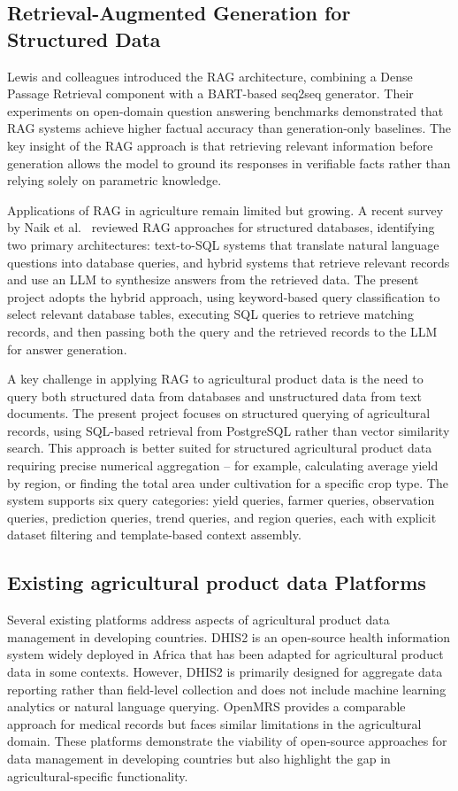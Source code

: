 \documentclass[12pt,a4paper,oneside]{report}
\begin{document}
\subsection{Retrieval-Augmented Generation for Structured Data}
Lewis and colleagues \cite{lewis2020} introduced the RAG architecture, combining a Dense Passage Retrieval component with a BART-based seq2seq generator. Their experiments on open-domain question answering benchmarks demonstrated that RAG systems achieve higher factual accuracy than generation-only baselines. The key insight of the RAG approach is that retrieving relevant information before generation allows the model to ground its responses in verifiable facts rather than relying solely on parametric knowledge.

Applications of RAG in agriculture remain limited but growing. A recent survey by Naik et al.\ \cite{naik2024} reviewed RAG approaches for structured databases, identifying two primary architectures: text-to-SQL systems that translate natural language questions into database queries, and hybrid systems that retrieve relevant records and use an LLM to synthesize answers from the retrieved data. The present project adopts the hybrid approach, using keyword-based query classification to select relevant database tables, executing SQL queries to retrieve matching records, and then passing both the query and the retrieved records to the LLM for answer generation.

A key challenge in applying RAG to agricultural product data is the need to query both structured data from databases and unstructured data from text documents. The present project focuses on structured querying of agricultural records, using SQL-based retrieval from PostgreSQL rather than vector similarity search. This approach is better suited for structured agricultural product data requiring precise numerical aggregation -- for example, calculating average yield by region, or finding the total area under cultivation for a specific crop type. The system supports six query categories: yield queries, farmer queries, observation queries, prediction queries, trend queries, and region queries, each with explicit dataset filtering and template-based context assembly.

\subsection{Existing agricultural product data Platforms}
Several existing platforms address aspects of agricultural product data management in developing countries. DHIS2 \cite{dhis22023} is an open-source health information system widely deployed in Africa that has been adapted for agricultural product data in some contexts. However, DHIS2 is primarily designed for aggregate data reporting rather than field-level collection and does not include machine learning analytics or natural language querying. OpenMRS \cite{openmrs2023} provides a comparable approach for medical records but faces similar limitations in the agricultural domain. These platforms demonstrate the viability of open-source approaches for data management in developing countries but also highlight the gap in agricultural-specific functionality.
\end{document}
